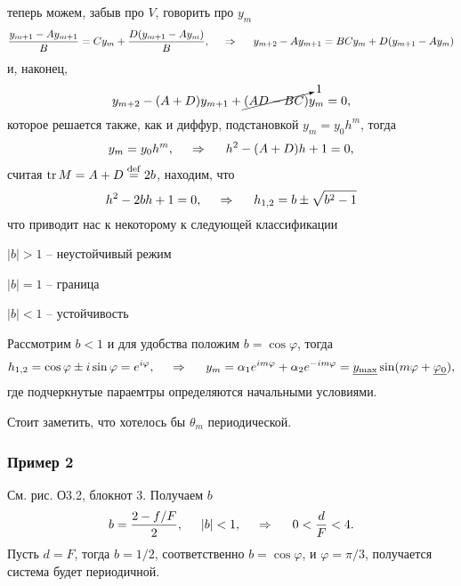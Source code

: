 теперь можем, забыв про $V$, говорить про $y_m$
\begin{equation*}
    \frac{y_{m+1}-A y_{m+1}}{B} = C y_m + \frac{D (y_{m+1}-Ay_m)}{B},
    \hspace{0.5cm} \Rightarrow \hspace{0.5cm}
    y_{m+2} - A y_{m+1} = BC y_m + D (y_{m+1} - A y_m)
\end{equation*}
и, наконец,
\begin{equation*}
    y_{m+2} - (A+D) y_{m+1} + 
    \cancelto{1}{(A D - B C)}
     y_m = 0,
\end{equation*}
которое решается также, как и диффур, подстановкой $y_m = y_0 h^m$, тогда
\begin{equation*}
    y_m = y_0 h^m, \hspace{0.5cm} \Rightarrow \hspace{0.5cm}
    h^2 - (A+D) h + 1 = 0,
\end{equation*}
считая $\mathop{\mathrm{tr}}\nolimits M = A+D \overset{\mathrm{def}}{=} 2 b$, находим, что
\begin{equation*}
    h^2 - 2 b h  +1 = 0, 
    \hspace{0.5cm} \Rightarrow \hspace{0.5cm}
    h_{1, 2} = b \pm \sqrt{b^2-1}
\end{equation*}
что приводит нас к некоторому к следующей классификации

$|b|>1$ -- неустойчивый режим

$|b|=1$ -- граница

$|b|<1$ -- устойчивость

\noindent
Рассмотрим $b < 1$ и для удобства положим $b = \cos \varphi$, тогда
\begin{equation*}
    h_{1, 2} = \cos \varphi \pm i \sin \varphi = e^{i\varphi},
    \hspace{0.5cm} \Rightarrow \hspace{0.5cm}
    y_m = \alpha_1 e^{im \varphi} + \alpha_2 e^{-im \varphi} = 
    \underline{y_{\textnormal{max}}} \sin (m \varphi + \underline{\varphi_0}),
\end{equation*}
где подчеркнутые параемтры определяются начальными условиями. 


Стоит заметить, что хотелось бы $\theta_m$ периодической. 


\subsubsection*{Пример 2}

См. рис. О3.2, блокнот 3. Получаем $b$
\begin{equation*}
    b=  \frac{2-f/F}{2}, \hspace{0.5 cm} |b|<1,
    \hspace{0.5cm} \Rightarrow \hspace{0.5cm}
    0 < \frac{d}{F} < 4.
\end{equation*}
Пусть $d=F$, тогда $b=1/2$, соответственно $b = \cos \varphi$, и $\varphi = \pi/3$, получается система будет периодичной.

